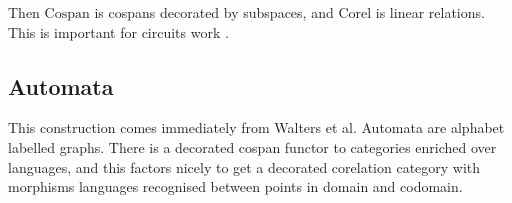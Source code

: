 Then $\mathrm{Cospan}$ is cospans decorated by subspaces, and $\mathrm{Corel}$
is linear relations. This is important for circuits work \cite{BF,BSZ}.

\subsection{Automata}
This construction comes immediately from Walters et al. Automata are alphabet
labelled graphs. There is a decorated cospan functor to categories enriched over
languages, and this factors nicely to get a decorated corelation category with
morphisms languages recognised between points in domain and codomain.




